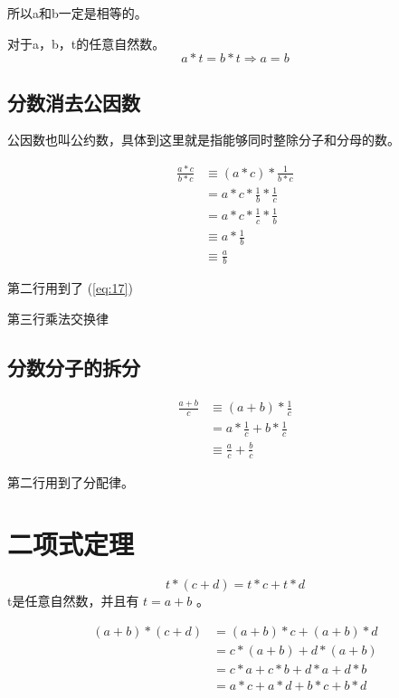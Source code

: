 \documentclass[12pt,oneside]{book}
\begin{document}
所以a和b一定是相等的。

对于a，b，t的任意自然数。
\begin{equation}
a*t = b*t  \Rightarrow a=b
\end{equation}



\subsection{分数消去公因数}
公因数也叫公约数，具体到这里就是指能够同时整除分子和分母的数。

\begin{align*}
\frac{a*c}{b*c} &\equiv (a * c) * \frac{1}{b*c}\\
&=a * c * \frac{1}{b} * \frac{1}{c}\\
&=a*c*\frac{1}{c}*\frac{1}{b}\\
&\equiv a*\frac{1}{b}\\
&\equiv \frac{a}{b}
\end{align*}

第二行用到了 (\ref{eq:17})

第三行乘法交换律


\subsection{分数分子的拆分}

\begin{align*}
\frac{a+b}{c} &\equiv (a+b) * \frac{1}{c}\\
&=a* \frac{1}{c} + b* \frac{1}{c}\\
&\equiv \frac{a}{c} + \frac{b}{c}
\end{align*}

第二行用到了分配律。

\section{二项式定理}
\begin{equation*}
t*(c + d) = t*c + t*d
\end{equation*}
t是任意自然数，并且有 $t=a+b$ 。

\begin{align*}
(a+b)*(c + d) &= (a+b)*c + (a+b)*d\\
                    &=c*(a+b) + d*(a+b)\\
                    &=c*a + c* b + d*a + d*b\\
                    &=a*c + a*d + b*c + b*d
\end{align*}
\end{document}
